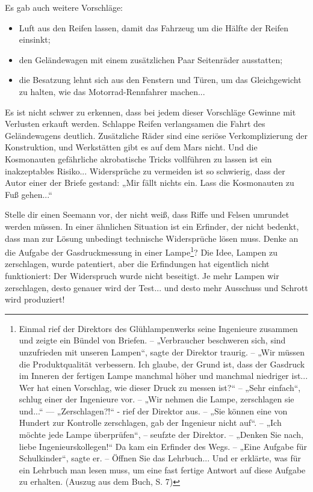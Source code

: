 \documentclass[11pt,a4paper]{article}
\begin{document}
Es gab auch weitere Vorschläge:
\begin{itemize}[noitemsep]
\item Luft aus den Reifen lassen, damit das Fahrzeug um die Hälfte der Reifen
  einsinkt;
\item den Geländewagen mit einem zusätzlichen Paar Seitenräder ausstatten;
\item die Besatzung lehnt sich aus den Fenstern und Türen, um das
  Gleichgewicht zu halten, wie das Motorrad-Rennfahrer machen...
\end{itemize}
Es ist nicht schwer zu erkennen, dass bei jedem dieser Vorschläge Gewinne mit
Verlusten erkauft werden. Schlappe Reifen verlangsamen die Fahrt des
Geländewagens deutlich.  Zusätz\-liche Räder sind eine seriöse
Verkomplizierung der Konstruktion, und Werkstätten gibt es auf dem Mars nicht.
Und die Kosmonauten gefährliche akrobatische Tricks vollführen zu lassen ist
ein inakzeptables Risiko...  Widersprüche zu vermeiden ist so schwierig, dass
der Autor einer der Briefe gestand: „Mir fällt nichts ein. Lass die
Kosmonauten zu Fuß gehen...“

Stelle dir einen Seemann vor, der nicht weiß, dass Riffe und Felsen umrundet
werden müssen.  In einer ähnlichen Situation ist ein Erfinder, der nicht
bedenkt, dass man zur Lösung unbedingt technische Widersprüche lösen muss.
Denke an die Aufgabe der Gasdruckmessung in einer Lampe\footnote{Einmal rief
  der Direktors des Glühlampenwerks seine Ingenieure zusammen und zeigte ein
  Bündel von Briefen.  -- „Verbraucher beschweren sich, sind unzufrieden mit
  unseren Lampen“, sagte der Direktor traurig. -- „Wir müssen die
  Produktqualität verbessern.  Ich glaube, der Grund ist, dass der Gasdruck im
  Inneren der fertigen Lampe manchmal höher und manchmal niedriger ist...  Wer
  hat einen Vorschlag, wie dieser Druck zu messen ist?“ -- „Sehr einfach“,
  schlug einer der Ingenieure vor. -- „Wir nehmen die Lampe, zerschlagen sie
  und...“ — „Zerschlagen?!“ - rief der Direktor aus.  -- „Sie können eine von
  Hundert zur Kontrolle zerschlagen, gab der Ingenieur nicht auf“.  -- „Ich
  möchte jede Lampe überprüfen“, -- seufzte der Direktor. -- „Denken Sie nach,
  liebe Ingenieurskollegen!“ Da kam ein Erfinder des Wegs.  -- „Eine Aufgabe
  für Schulkinder“, sagte er. -- Öffnen Sie das Lehrbuch...  Und er erklärte,
  was für ein Lehrbuch man lesen muss, um eine fast fertige Antwort auf diese
  Aufgabe zu erhalten. (Auszug aus dem Buch, S. 7)}?  Die Idee, Lampen zu
zerschlagen, wurde patentiert, aber die Erfindungen hat eigentlich nicht
funktioniert: Der Widerspruch wurde nicht beseitigt. Je mehr Lampen wir
zerschlagen, desto genauer wird der Test...  und desto mehr Ausschuss und
Schrott wird produziert!
\end{document}
